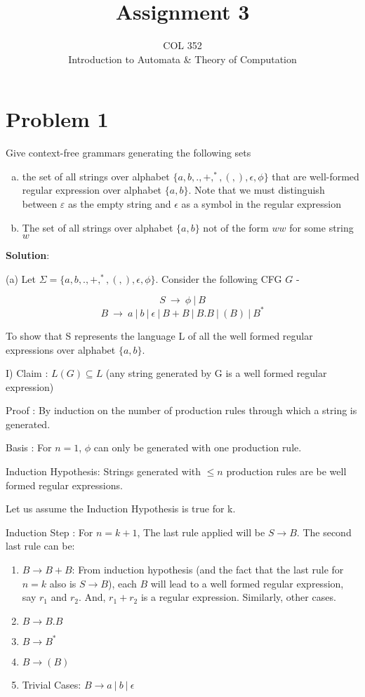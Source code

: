 \documentclass{article}
\title{Assignment 3}
\author{COL 352\\
    Introduction to Automata \& 
    Theory of Computation}
\date{}
\begin{document}
    \maketitle
    
    \section*{Problem 1} Give context-free grammars generating the following sets
    
    \begin{enumerate}[(a)]
        \item the set of all strings over alphabet $\{a,b,.,+,^*,(,),\epsilon,\phi\}$ that are well-formed regular expression over alphabet $\{a,b\}$.  Note that we must distinguish between $\varepsilon$ as the empty string and $\epsilon$ as a symbol in the regular expression
        \item The set of all strings over alphabet $\{a,b\}$ not of the form $ww$ for some string $w$
    \end{enumerate}
    
    \textbf{Solution}:
    
    (a) Let $\Sigma = \{a,b,.,+,^*,(,),\epsilon,\phi\}$. Consider the following CFG $G$ -
    
    $$ S \ \rightarrow \ \phi \ |\ B$$
    $$ B \ \rightarrow \ a\ |\ b \ |\ \epsilon \ |\ B+B\ |\ B.B\ |\ (B)\ |\ B^* $$
    
    \quad To show that S represents the language L of all the well formed regular expressions over alphabet $\{a,b\}$.
    
    \quad I) Claim : $L(G) \subseteq L $ (any string generated by G is a well formed regular expression)
    
    \quad Proof : By induction on the number of production rules through which a string is generated.
    
    \quad Basis : For $n=1$, $\phi$ can only be generated with one production rule.
    
    \quad Induction Hypothesis: Strings generated with $\leq n$ production rules are be well formed regular expressions.
    
    \quad Let us assume the Induction Hypothesis is true for k.
    
    \quad Induction Step : For $n = k + 1$, The last rule applied will be $S\rightarrow B$. The second last rule can be:
    \begin{enumerate}
        \item $B \rightarrow B + B$: From induction hypothesis (and the fact that the last rule for $n = k$ also is $S \rightarrow B$), each $B$ will lead to a well formed regular expression, say $r_1$ and $r_2$. And, $r_1 + r_2$ is a regular expression. 
        Similarly, other cases.
        \item $B \rightarrow B.B$
        \item $B \rightarrow B^*$
        \item $B \rightarrow (B)$
        \item Trivial Cases: $B \rightarrow a\ |\ b\ |\ \epsilon$
    \end{enumerate}
    
\end{document}
